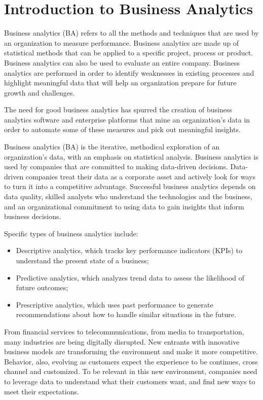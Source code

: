 \section{Introduction to Business Analytics}

Business analytics (BA) refers to all the methods and techniques that are used by an organization to measure performance. Business analytics are made up of statistical methods that can be applied to a specific project, process or product. Business analytics can also be used to evaluate an entire company. Business analytics are performed in order to identify weaknesses in existing processes and highlight meaningful data that will help an organization prepare for future growth and challenges.

The need for good business analytics has spurred the creation of business analytics software and enterprise platforms that mine an organization’s data in order to automate some of these measures and pick out meaningful insights.

Business analytics (BA) is the iterative, methodical exploration of an organization's data, with an emphasis on statistical analysis. Business analytics is used by companies that are committed to making data-driven decisions. Data-driven companies treat their data as a corporate asset and actively look for ways to turn it into a competitive advantage. Successful business analytics depends on data quality, skilled analysts who understand the technologies and the business, and an organizational commitment to using data to gain insights that inform business decisions.

Specific types of business analytics include:
\begin{itemize}
    \item Descriptive analytics, which tracks key performance indicators (KPIs) to understand the present state of a business;
    \item Predictive analytics, which analyzes trend data to assess the likelihood of future outcomes; 
    \item Prescriptive analytics, which uses past performance to generate recommendations about how to handle similar situations in the future.
\end{itemize}

From financial services to telecommunications, from media to transportation, many industries are being digitally disrupted. New entrants with innovative business models are transforming the environment and make it more competitive. Behavior, also, evolving as customers expect the experience to be continues, cross channel and customized. To be relevant in this new environment, companies need to leverage data to understand what their customers want, and find new ways to meet their expectations.

